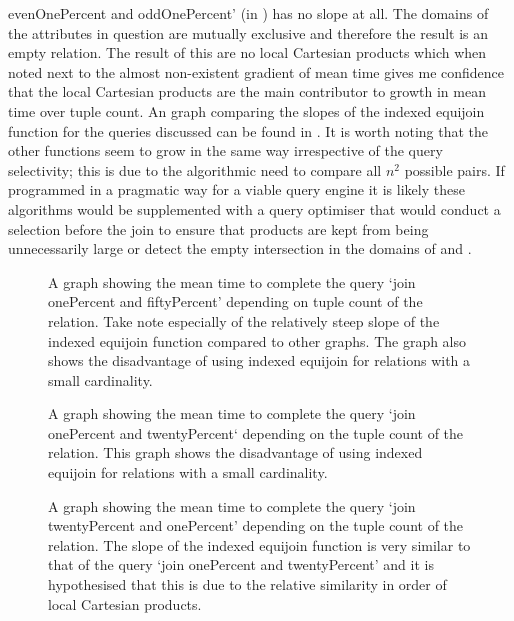 evenOnePercent and oddOnePercent' (in
) has no slope at all.
The domains of the attributes in question are mutually exclusive and therefore
the result is an empty relation. The result of this are no local Cartesian
products which when noted next to the almost non-existent gradient of mean time
gives me confidence that the local Cartesian products are the main contributor
to growth in mean time over tuple count. An graph comparing the slopes of the
indexed equijoin function for the queries discussed can be found in
. It is worth noting that the other
functions seem to grow in the same way irrespective of the query selectivity;
this is due to the algorithmic need to compare all $n^2$ possible pairs. If
programmed in a pragmatic way for a viable query engine it is likely these
algorithms would be supplemented with a query optimiser that would conduct a
selection before the join to ensure that products are kept from being
unnecessarily large or detect the empty intersection in the domains of
 and .

\begin{figure}[p]
    
    \caption{A graph showing the mean time to complete the query `join
    onePercent and fiftyPercent' depending on tuple count of the relation. Take
note especially of the relatively steep slope of the indexed equijoin function
compared to other graphs. The graph also shows the disadvantage of using indexed
equijoin for relations with a small cardinality.}
    \label{fig:benchmark:onePercent-fiftyPercent-tuples}
\end{figure}

\begin{figure}[p]
    
    \caption{A graph showing the mean time to complete the query `join
    onePercent and twentyPercent` depending on the tuple count of the relation.
This graph shows the disadvantage of using indexed equijoin for relations with a
small cardinality.}
    \label{fig:benchmark:onePercent-twentyPercent-tuples}
\end{figure}

\begin{figure}[p]
    
    \caption{A graph showing the mean time to complete the query `join
    twentyPercent and onePercent' depending on the tuple count of the relation.
The slope of the indexed equijoin function is very similar to that of the query
`join onePercent and twentyPercent' and it is hypothesised that this is due to
the relative similarity in order of local Cartesian products.}
    \label{fig:benchmark:twentyPercent-onePercent-tuples}
\end{figure}

